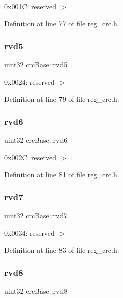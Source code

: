 0x001C\+: reserved $>$ 

Definition at line 77 of file reg\+\_\+crc.\+h.

\mbox{\label{structcrcBase_a556e9011fd05042a90970e513471e569}} 
\subsubsection{\texorpdfstring{rvd5}{rvd5}}
{\footnotesize\ttfamily uint32 crc\+Base\+::rvd5}

0x0024\+: reserved $>$ 

Definition at line 79 of file reg\+\_\+crc.\+h.

\mbox{\label{structcrcBase_ac696dc57ad991726fb62af8521a8dc1d}} 
\subsubsection{\texorpdfstring{rvd6}{rvd6}}
{\footnotesize\ttfamily uint32 crc\+Base\+::rvd6}

0x002C\+: reserved $>$ 

Definition at line 81 of file reg\+\_\+crc.\+h.

\mbox{\label{structcrcBase_a0d066ff068caa96d66661653383a5501}} 
\subsubsection{\texorpdfstring{rvd7}{rvd7}}
{\footnotesize\ttfamily uint32 crc\+Base\+::rvd7}

0x0034\+: reserved $>$ 

Definition at line 83 of file reg\+\_\+crc.\+h.

\mbox{\label{structcrcBase_ab0d501707089ccad5da2cbd62732b49b}} 
\subsubsection{\texorpdfstring{rvd8}{rvd8}}
{\footnotesize\ttfamily uint32 crc\+Base\+::rvd8}

